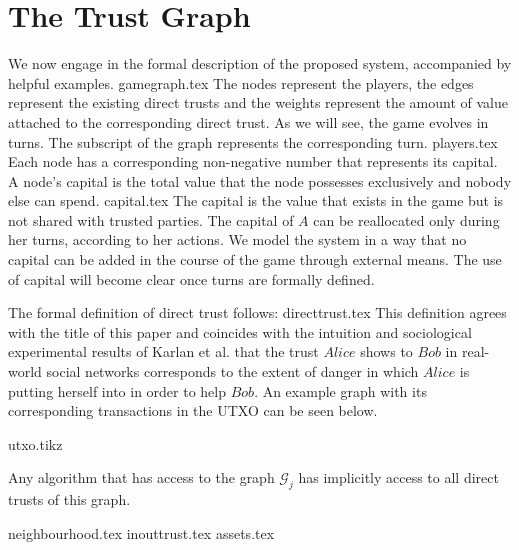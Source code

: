 \section{The Trust Graph}
  We now engage in the formal description of the proposed system, accompanied by helpful examples.
  {gamegraph.tex}
  \noindent The nodes represent the players, the edges represent the existing direct trusts and the weights represent the
  amount of value attached to the corresponding direct trust. As we will see, the game evolves in turns. The subscript of the
  graph represents the corresponding turn.
  {players.tex}
  \noindent Each node has a corresponding non-negative number that represents its capital. A node's capital is the total value
  that the node possesses exclusively and nobody else can spend.
  {capital.tex}
  \noindent The capital is the value that exists in the game but is not shared with trusted parties. The capital of $A$ can be
  reallocated only during her turns, according to her actions. We model the system in a way that no capital can be added in
  the course of the game through external means. The use of capital will become clear once turns are formally defined.

  The formal definition of direct trust follows:
  {directtrust.tex}
  \noindent This definition agrees with the title of this paper and coincides with the intuition and sociological experimental
  results of Karlan et al. \cite{kmrs} that the trust $Alice$ shows to $Bob$ in real-world social networks corresponds to the
  extent of danger in which $Alice$ is putting herself into in order to help $Bob$. An example graph with its corresponding
  transactions in the UTXO can be seen below.

  {utxo.tikz}

  \noindent Any algorithm that has access to the graph $\mathcal{G}_j$ has implicitly access to all direct trusts of this
  graph.

  {neighbourhood.tex}
  {inouttrust.tex}
  \ifdefined\proceedings
  \else
    {assets.tex}
  \fi
